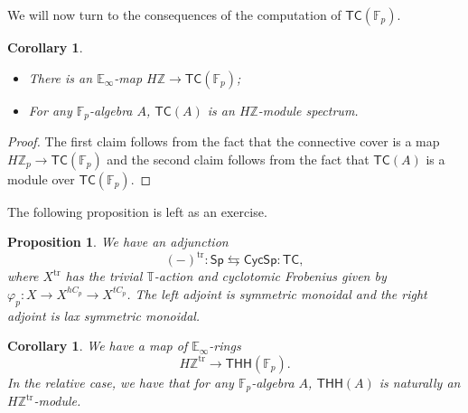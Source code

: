 \documentclass[10pt, oneside]{memoir}
\newtheorem{cor}[thm]{Corollary}
\newtheorem{prop}[thm]{Proposition}
\theoremstyle{definition}
\theoremstyle{remark}
\theoremstyle{plain}
\theoremstyle{definition}
\theoremstyle{remark}
\newcommand{\Z}{\mathbb{Z}}
\newcommand{\E}{\mathbb{E}}
\newcommand{\F}{\mathbb{F}}
\newcommand{\T}{\mathbb{T}}
\newcommand{\mr}[1]{\mathrm{#1}}
\newcommand{\ms}[1]{\mathsf{#1}}
\newcommand{\1}{\mathbf{1}}
\newcommand{\2}{\mathbf{2}}
\newcommand{\3}{\mathbf{3}}
\newcommand{\THH}{\ms{THH}}
\newcommand{\TC}{\ms{TC}}
\begin{document}
We will now turn to the consequences of the computation of $\TC(\F_p)$.

\begin{cor}\leavevmode
    \begin{itemize}
        \item There is an $\E_{\infty}$-map $H\Z \to \TC(\F_p)$;
        \item For any $\F_p$-algebra $A$, $\TC(A)$ is an $H\Z$-module spectrum.
    \end{itemize}
\end{cor}

\begin{proof}
    The first claim follows from the fact that the connective cover is a map $H\Z_p \to \TC(\F_p)$ and the second claim follows from the fact that $\TC(A)$ is a module over $\TC(\F_p)$.
\end{proof}

The following proposition is left as an exercise.
\begin{prop}
    We have an adjunction
    \[ (-)^{\mr{tr}} \colon \ms{Sp} \leftrightarrows \ms{CycSp} \colon \TC, \]
    where $X^{\mr{tr}}$ has the trivial $\T$-action and cyclotomic Frobenius given by $\varphi_p \colon X \to X^{hC_p} \to X^{t C_p}$. The left adjoint is symmetric monoidal and the right adjoint is lax symmetric monoidal.
\end{prop}

\begin{cor}
    We have a map of $\E_{\infty}$-rings
    \[ H\Z^{\mr{tr}} \to \THH(\F_p). \]
    In the relative case, we have that for any $\F_p$-algebra $A$, $\THH(A)$ is naturally an $H\Z^{\mr{tr}}$-module.
\end{cor}
\end{document}
